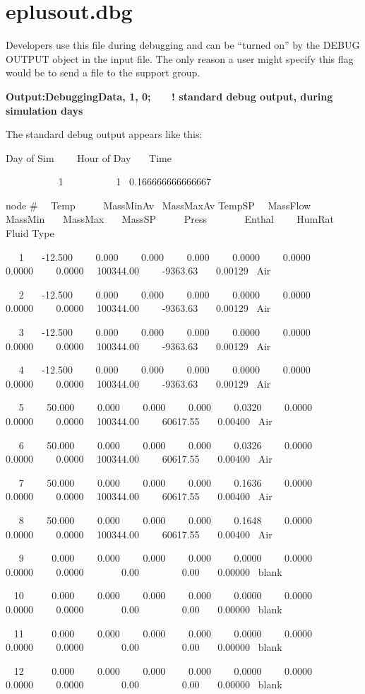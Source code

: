 \section{eplusout.dbg}\label{eplusout.dbg}

Developers use this file during debugging and can be ``turned on'' by the DEBUG OUTPUT object in the input file. The only reason a user might specify this flag would be to send a file to the support group.

\textbf{Output:DebuggingData, 1, 0;~~~ ! standard debug output, during simulation days}

The standard debug output appears like this:

Day of Sim~~~~ Hour of Day~~~ Time

~~~~~~~~~~ 1~~~~~~~~~~ 1~ 0.166666666666667

node \#~~ Temp~~~~~ MassMinAv~ MassMaxAv TempSP~~ MassFlow~~ MassMin~~~ MassMax~~~ MassSP~~~~~ Press~~~~~~~ Enthal~~~~ HumRat~~~ Fluid Type

~~ 1~~~ -12.500~~~~ 0.000~~~~ 0.000~~~~ 0.000~~~~ 0.0000~~~~ 0.0000~~~~ 0.0000~~~~ 0.0000~~ 100344.00~~~~ -9363.63~~~ 0.00129~ Air

~~ 2~~~ -12.500~~~~ 0.000~~~~ 0.000~~~~ 0.000~~~~ 0.0000~~~~ 0.0000~~~~ 0.0000~~~~ 0.0000~~ 100344.00~~~~ -9363.63~~~ 0.00129~ Air

~~ 3~~~ -12.500~~~~ 0.000~~~~ 0.000~~~~ 0.000~~~~ 0.0000~~~~ 0.0000~~~~ 0.0000~~~~ 0.0000~~ 100344.00~~~~ -9363.63~~~ 0.00129~ Air

~~ 4~~~ -12.500~~~~ 0.000~~~~ 0.000~~~~ 0.000~~~~ 0.0000~~~~ 0.0000~~~~ 0.0000~~~~ 0.0000~~ 100344.00~~~~ -9363.63~~~ 0.00129~ Air

~~ 5~~~~ 50.000~~~~ 0.000~~~~ 0.000~~~~ 0.000~~~~ 0.0320~~~~ 0.0000~~~~ 0.0000~~~~ 0.0000~~ 100344.00~~~~ 60617.55~~~ 0.00400~ Air

~~ 6~~~~ 50.000~~~~ 0.000~~~~ 0.000~~~~ 0.000~~~~ 0.0326~~~~ 0.0000~~~~ 0.0000~~~~ 0.0000~~ 100344.00~~~~ 60617.55~~~ 0.00400~ Air

~~ 7~~~~ 50.000~~~~ 0.000~~~~ 0.000~~~~ 0.000~~~~ 0.1636~~~~ 0.0000~~~~ 0.0000~~~~ 0.0000~~ 100344.00~~~~ 60617.55~~~ 0.00400~ Air

~~ 8~~~~ 50.000~~~~ 0.000~~~~ 0.000~~~~ 0.000~~~~ 0.1648~~~~ 0.0000~~~~ 0.0000~~~~ 0.0000~~ 100344.00~~~~ 60617.55~~~ 0.00400~ Air

~~ 9~~~~~ 0.000~~~~ 0.000~~~~ 0.000~~~~ 0.000~~~~ 0.0000~~~~ 0.0000~~~~ 0.0000~~~~ 0.0000~~~~~~~ 0.00~~~~~~~~ 0.00~~~ 0.00000~ blank

~ 10~~~~~ 0.000~~~~ 0.000~~~~ 0.000~~~~ 0.000~~~~ 0.0000~~~~ 0.0000~~~~ 0.0000~~~~ 0.0000~~~~~~~ 0.00~~~~~~~~ 0.00~~~ 0.00000~ blank

~ 11~~~~~ 0.000~~~~ 0.000~~~~ 0.000~~~~ 0.000~~~~ 0.0000~~~~ 0.0000~~~~ 0.0000~~~~ 0.0000~~~~~~~ 0.00~~~~~~~~ 0.00~~~ 0.00000~ blank

~ 12~~~~~ 0.000~~~~ 0.000~~~~ 0.000~~~~ 0.000~~~~ 0.0000~~~~ 0.0000~~~~ 0.0000~~~~ 0.0000~~~~~~~ 0.00~~~~~~~~ 0.00~~~ 0.00000~ blank
